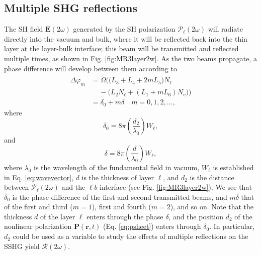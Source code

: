 \documentclass[aps,prb,10pt,showpacs,letterpaper,twocolumn]{revtex4-1}
\begin{document}

\subsection{Multiple SHG reflections}\label{sec:multiple2w}

The SH field $\mathbf{E}(2\omega)$ generated by the SH polarization
$\boldsymbol{\mathcal{P}}_{\ell}(2\omega)$ will radiate directly into the vacuum
and bulk, where it will be reflected back into the thin layer at the layer-bulk
interface; this beam will be transmitted and reflected multiple times, as shown
in Fig. \ref{fig:MR3layer2w}. As the two beams propagate, a phase difference
will develop between them according to
\begin{equation}\label{eq:m99}
\begin{split}
\Delta\varphi_{m} 
&= \tilde{\Omega}
\Big(
\big(L_{3} + L_{4} + 2mL_{5}\big)N_{\ell}\\
 &\hspace{14pt}- \big(L_{2}N_{\ell} + (L_{1} + mL_{6})N_{v}\big)
\Big)\\
&= \delta_{0} + m\delta\quad m=0,1,2,\ldots,
\end{split}
\end{equation}
where
\begin{equation}\label{eq:delta0}
\delta_{0} =
8\pi\left(\frac{d_{2}}{\lambda_{0}}\right)W_{\ell},
\end{equation}
and
\begin{equation}\label{eq:delta}
\delta = 8\pi
\left(\frac{d}{\lambda_{0}}\right)W_{\ell},
\end{equation}
where $\lambda_{0}$ is the wavelength of the fundamental field in vacuum,
$W_{\ell}$ is established in Eq. \eqref{eq:wavevector}, $d$ is the thickness of
layer $\ell$, and $d_{2}$ is the distance between
$\boldsymbol{\mathcal{P}}_{\ell}(2\omega)$ and the $\ell b$ interface (see Fig.
\ref{fig:MR3layer2w}). We see that $\delta_{0}$ is the phase difference of the
first and second transmitted beams, and $m\delta$ that of the first and third
($m = 1$), first and fourth ($m = 2$), and so on. Note that the thickness $d$ of
the layer $\ell$ enters through the phase $\delta$, and the position $d_{2}$ of
the nonlinear polarization $\mathbf{P}(\mathbf{r},t)$ (Eq. \eqref{eq:psheet})
enters through $\delta_{0}$. In particular, $d_{2}$ could be used as a variable
to study the effects of multiple reflections on the SSHG yield
$\mathcal{R}(2\omega)$.
\end{document}
